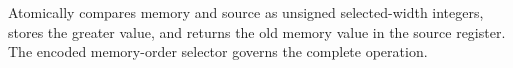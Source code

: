 Atomically compares memory and source as unsigned selected-width integers, stores the greater value, and returns the
old memory value in the source register. The encoded memory-order selector governs the complete operation.
